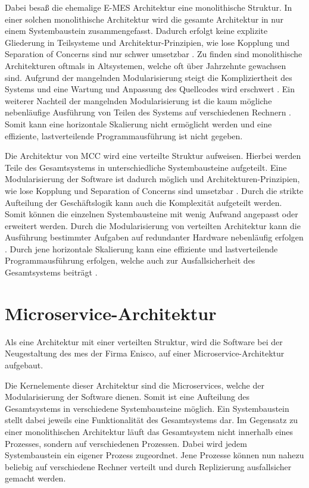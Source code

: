 Dabei besaß die ehemalige E-MES Architektur eine monolithische Struktur. In einer solchen monolithische Architektur wird die gesamte Architektur in nur einem Systembaustein zusammengefasst. Dadurch erfolgt keine explizite Gliederung in Teilsysteme und Architektur-Prinzipien, wie lose Kopplung und Separation of Concerns sind nur schwer umsetzbar \cite{Vogel.2009}. Zu finden sind monolithische Architekturen oftmals in Altsystemen, welche oft über Jahrzehnte gewachsen sind. Aufgrund der mangelnden Modularisierung steigt die Kompliziertheit des Systems und eine Wartung und Anpassung des Quellcodes wird erschwert \cite{Prof.Dr.AndreasFink.2012b}. Ein weiterer Nachteil der mangelnden Modularisierung ist die kaum mögliche nebenläufige Ausführung von Teilen des Systems auf verschiedenen Rechnern \cite{Prof.Dr.AndreasFink.2012b}. Somit kann eine horizontale Skalierung nicht ermöglicht werden und eine effiziente, lastverteilende Programmausführung ist nicht gegeben.

Die Architektur von MCC wird eine verteilte Struktur aufweisen. Hierbei werden Teile des Gesamtsystems in unterschiedliche Systembausteine aufgeteilt. Eine Modularisierung der Software ist dadurch möglich und Architekturen-Prinzipien, wie lose Kopplung und Separation of Concerns sind umsetzbar \cite{Vogel.2009}. Durch die strikte Aufteilung der Geschäftslogik kann auch die Komplexität aufgeteilt werden. Somit können die einzelnen Systembausteine mit wenig Aufwand angepasst oder erweitert werden. Durch die Modularisierung von verteilten Architektur kann die Ausführung bestimmter Aufgaben auf redundanter Hardware nebenläufig erfolgen \cite{Prof.Dr.AndreasFink.2012}. Durch jene horizontale Skalierung kann eine effiziente und lastverteilende Programmausführung erfolgen, welche auch zur Ausfallsicherheit des Gesamtsystems beiträgt \cite{Prof.Dr.AndreasFink.2012}.

\section{Microservice-Architektur\label{sec2.2:Unterpunkt-2}}

Als eine Architektur mit einer verteilten Struktur, wird die Software bei der Neugestaltung des \gls{mes} der Firma Enisco, auf einer Microservice-Architektur aufgebaut.

Die Kernelemente dieser Architektur sind die Microservices, welche der Modularisierung der Software dienen. Somit ist eine Aufteilung des Gesamtsystems in verschiedene Systembausteine möglich. Ein Systembaustein stellt dabei jeweils eine Funktionalität des Gesamtsystems dar. Im Gegensatz zu einer monolithischen Architektur läuft das Gesamtsystem nicht innerhalb eines Prozesses, sondern auf verschiedenen Prozessen. Dabei wird jedem Systembaustein ein eigener Prozess zugeordnet. Jene Prozesse können nun nahezu beliebig auf verschiedene Rechner verteilt und durch Replizierung ausfallsicher gemacht werden. \cite{GaryCalcott.2018}

